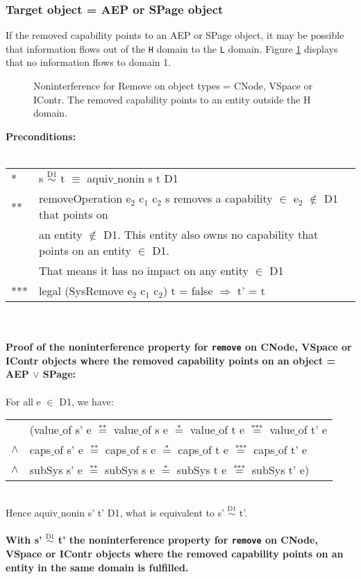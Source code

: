 \subsubsection{Target object = AEP or SPage object}
If the removed capability points to an AEP or SPage object, it may be possible that information flows out of the \texttt{H} domain to the \texttt{L} domain. Figure \ref{fig:RemoveOutside} displays that no information flows to domain 1.
\begin{figure}[H]
\caption{Noninterference for Remove on object types = CNode, VSpace or IContr. The removed capability points to an entity outside the H domain.}
\label{fig:RemoveOutside}
\end{figure}
\textbf{Preconditions:} \\ \\
\begin{tabular}{ll}
* & s $\overset{\text{D1}}{\sim}$ t $\equiv$ aquiv$\_$nonin s t D1	\\ 
** & removeOperation e$_2$ c$_1$ c$_2$ s removes a capability $\in$ e$_2$ $\notin$ D1 that points on \\
& an entity $\notin$ D1. This entity also owns no capability that points on an entity $\in$ D1. \\
& That means it has no impact on any entity $\in$ D1 \\ 
*** & legal (SysRemove e$_2$ c$_1$ c$_2$) t = false $\Rightarrow$ t' = t
\end{tabular} \\ \\ 
\textbf{Proof of the noninterference property for \texttt{remove} on CNode, VSpace or IContr objects where the removed capability points on an object = AEP $\vee$ SPage:}\\ \\
For all e $\in$ D1, we have: \\ 
\begin{tabular}{ll}
& (value$\_$of s' e $\overset{\text{**}}{=}$ value$\_$of s e $\overset{\text{*}}{=}$ value$\_$of t e $\overset{\text{***}}{=}$ value$\_$of t' e \\
$\wedge$ & caps$\_$of s' e $\overset{\text{**}}{=}$ caps$\_$of s e $\overset{\text{*}}{=}$ caps$\_$of t e $\overset{\text{***}}{=}$ caps$\_$of t' e \\
$\wedge$ & subSys s' e $\overset{\text{**}}{=}$ subSys s e $\overset{\text{*}}{=}$ subSys t e $\overset{\text{***}}{=}$ subSys t' e)
\end{tabular} \\
Hence aquiv$\_$nonin s' t' D1, what is equivalent to s' $\overset{\text{D1}}{\sim}$ t'. \\ \\ 
\textbf{With s' $\overset{\text{D1}}{\sim}$ t' the noninterference property for \texttt{remove} on CNode, VSpace or IContr objects where the removed capability points on an entity in the same domain is fulfilled.}  
